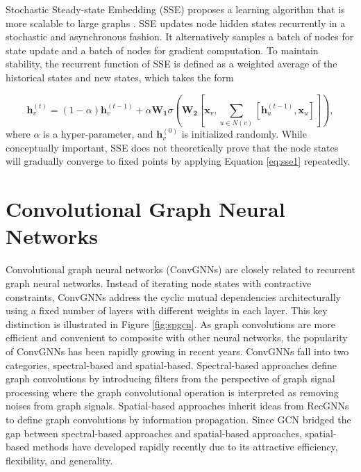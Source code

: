     Stochastic Steady-state Embedding (SSE) proposes a learning algorithm that is more scalable to large graphs \cite{dai2018learning}. SSE updates node hidden states recurrently in a stochastic and asynchronous fashion.  It alternatively samples a batch of nodes for state update and a batch of nodes for gradient computation. To maintain stability, the recurrent function of SSE is defined as a weighted average of the historical states and new states, which takes the form
    
    \begin{equation}
    \label{eq:sse1}
    \mathbf{h}_v^{(t)} = (1-\alpha)\mathbf{h}_v^{(t-1)}+\alpha \mathbf{W_1}\sigma(\mathbf{W_2}[\mathbf{x}_v,\sum_{u\in N(v)}[\mathbf{h}_u^{(t-1)},\mathbf{x}_u]]),
    \end{equation}
    where $\alpha$ is a hyper-parameter, and $\mathbf{h}_v^{(0)}$ is initialized randomly.  While conceptually important, SSE does not theoretically prove that the node states will gradually converge to fixed points by applying Equation \ref{eq:sse1} repeatedly.
    
    


	\section{Convolutional Graph Neural  Networks}
	\label{sec:gcn}

    Convolutional graph neural networks (ConvGNNs) are closely related to recurrent graph  neural networks. Instead of iterating node states with contractive constraints, ConvGNNs address the cyclic mutual dependencies architecturally using a fixed number of layers with different weights in each layer. 
    This key distinction is illustrated in Figure \ref{fig:spgcn}. 
    As graph convolutions are more efficient and convenient to composite with other neural networks, the popularity of ConvGNNs has been rapidly growing in recent years. 
	ConvGNNs fall into two categories, spectral-based and spatial-based. Spectral-based approaches define graph convolutions by introducing filters from the perspective of graph signal processing \cite{shuman2013emerging} where the graph convolutional operation is interpreted as removing noises from graph signals. Spatial-based approaches inherit ideas from RecGNNs to define graph convolutions by information propagation. Since GCN \cite{kipf2017semi} bridged the gap between spectral-based approaches and spatial-based approaches, spatial-based methods have developed rapidly recently due to its attractive efficiency, flexibility, and generality.


